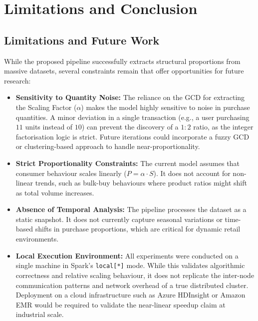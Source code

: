 \documentclass[10pt, twocolumn]{article}
\begin{document}
\section{Limitations and Conclusion}
\label{sec:limitations}

\subsection{Limitations and Future Work}

While the proposed pipeline successfully extracts structural proportions from
massive datasets, several constraints remain that offer opportunities for
future research:

\begin{itemize}
    \item \textbf{Sensitivity to Quantity Noise:} The reliance on the GCD for
          extracting the Scaling Factor ($\alpha$) makes the model highly sensitive to
          noise in purchase quantities. A minor deviation in a single transaction
          (e.g., a user purchasing $11$ units instead of $10$) can prevent the discovery
          of a $1{:}2$ ratio, as the integer factorisation logic is strict. Future
          iterations could incorporate a fuzzy GCD or clustering-based approach to
          handle near-proportionality.

    \item \textbf{Strict Proportionality Constraints:} The current model
          assumes that consumer behaviour scales linearly ($P = \alpha \cdot S$). It does
          not account for non-linear trends, such as bulk-buy behaviours where product
          ratios might shift as total volume increases.

    \item \textbf{Absence of Temporal Analysis:} The pipeline processes the
          dataset as a static snapshot. It does not currently capture seasonal variations
          or time-based shifts in purchase proportions, which are critical for dynamic
          retail environments.

    \item \textbf{Local Execution Environment:} All experiments were conducted
          on a single machine in Spark's \texttt{local[*]} mode. While this validates
          algorithmic correctness and relative scaling behaviour, it does not replicate
          the inter-node communication patterns and network overhead of a true
          distributed cluster. Deployment on a cloud infrastructure such as Azure
          HDInsight or Amazon EMR would be required to validate the near-linear speedup
          claim at industrial scale.
\end{itemize}
\end{document}
